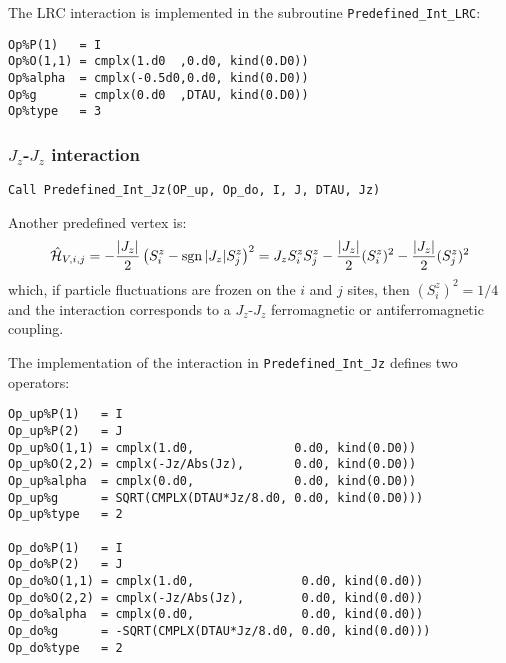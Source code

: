 The LRC interaction is implemented in the subroutine \texttt{Predefined\_Int\_LRC}:
\begin{lstlisting}[style=fortran]
Op%P(1)   = I
Op%O(1,1) = cmplx(1.d0  ,0.d0, kind(0.D0))
Op%alpha  = cmplx(-0.5d0,0.d0, kind(0.D0))
Op%g      = cmplx(0.d0  ,DTAU, kind(0.D0)) 
Op%type   = 3
\end{lstlisting}


\subsubsection{$J_z$-$J_z$ interaction}

\begin{lstlisting}[style=fortran]
Call Predefined_Int_Jz(OP_up, Op_do, I, J, DTAU, Jz)
\end{lstlisting}

Another predefined vertex is:
\begin{align}
\hat{\mathcal{H}}_{V,i,j} =
- \frac{|J_z|}{2}  \left( S^{z}_i - \operatorname{sgn}|J_z| S^{z}_j \right)^2 =
J_z  S^{z}_i  S^{z}_j  - \frac{|J_z|}{2} (S^{z}_i)^2 - \frac{|J_z|}{2}(S^{z}_j)^2 
\end{align} 
which, if particle fluctuations are frozen on the $i$ and $j$ sites, then $(S^{z}_i)^2 = 1/4$ and the interaction corresponds to a $J_z$-$J_z$ ferromagnetic or antiferromagnetic coupling.

The implementation of the interaction in \texttt{Predefined\_Int\_Jz} defines two operators:
\begin{lstlisting}[style=fortran]
Op_up%P(1)   = I
Op_up%P(2)   = J
Op_up%O(1,1) = cmplx(1.d0,              0.d0, kind(0.D0))
Op_up%O(2,2) = cmplx(-Jz/Abs(Jz),       0.d0, kind(0.D0))
Op_up%alpha  = cmplx(0.d0,              0.d0, kind(0.D0))
Op_up%g      = SQRT(CMPLX(DTAU*Jz/8.d0, 0.d0, kind(0.D0))) 
Op_up%type   = 2

Op_do%P(1)   = I
Op_do%P(2)   = J
Op_do%O(1,1) = cmplx(1.d0,               0.d0, kind(0.d0))
Op_do%O(2,2) = cmplx(-Jz/Abs(Jz),        0.d0, kind(0.d0))
Op_do%alpha  = cmplx(0.d0,               0.d0, kind(0.d0))
Op_do%g      = -SQRT(CMPLX(DTAU*Jz/8.d0, 0.d0, kind(0.d0))) 
Op_do%type   = 2

\end{lstlisting}
